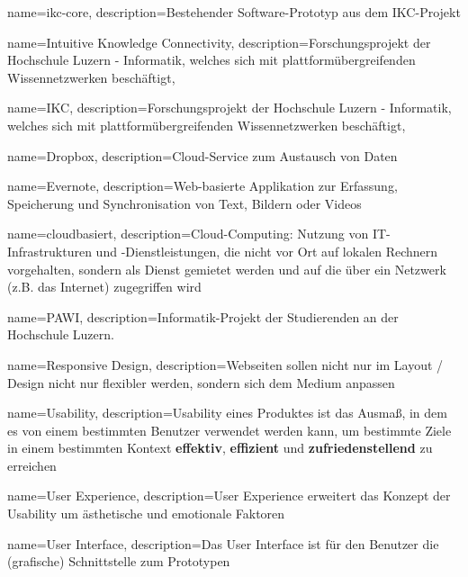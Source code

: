 \usepackage[acronym,noredefwarn]{glossaries}
\makenoidxglossaries

{
    name=ikc-core,
    description={Bestehender Software-Prototyp aus dem IKC-Projekt}
}

{
    name=Intuitive Knowledge Connectivity,
    description={Forschungsprojekt der Hochschule Luzern - Informatik, welches sich mit plattformübergreifenden Wissennetzwerken beschäftigt},
}

{
    name=IKC,
    description={Forschungsprojekt der Hochschule Luzern - Informatik, welches sich mit plattformübergreifenden Wissennetzwerken beschäftigt},
}


{
    name=Dropbox,
    description={Cloud-Service zum Austausch von Daten}
    \cite{dropbox}
}

{
    name=Evernote,
    description={Web-basierte Applikation zur Erfassung, Speicherung und Synchronisation von Text, Bildern oder Videos}
    \cite{evernote}
}

{
    name=cloudbasiert,
    description={Cloud-Computing: Nutzung von IT-Infrastrukturen und -Dienstleistungen, die nicht vor Ort auf lokalen Rechnern vorgehalten, sondern als Dienst gemietet werden und auf die über ein Netzwerk (z.B. das Internet) zugegriffen wird} \cite{duden.de}
}

{
    name=PAWI,
    description={Informatik-Projekt der Studierenden an der Hochschule Luzern.}
}

{
    name=Responsive Design,
    description={Webseiten sollen nicht nur im Layout / Design nicht nur flexibler werden, sondern sich dem Medium anpassen}
    \cite[S.8]{responsive-webdesign}
}

{
    name=Usability,
    description={Usability eines Produktes ist das Ausmaß, in dem es von einem bestimmten Benutzer verwendet werden kann, um bestimmte Ziele in einem bestimmten Kontext \textbf{effektiv}, \textbf{effizient} und \textbf{zufriedenstellend} zu erreichen}
    \cite{usab}
}

{
    name=User Experience,
    description={User Experience erweitert das Konzept der \gls{Usability} um ästhetische und emotionale Faktoren}
    \cite{ux}
}

{
    name=User Interface,
    description={Das User Interface ist für den Benutzer die (grafische) Schnittstelle zum Prototypen}
}

